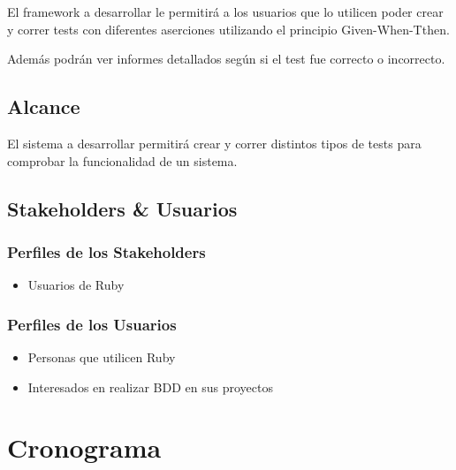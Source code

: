 \documentclass{article}
\begin{document}
El framework a desarrollar le permitirá a los usuarios que lo utilicen poder crear y correr tests con diferentes aserciones 
utilizando el principio Given-When-Tthen. \newline

Además podrán ver informes detallados según si el test fue correcto o incorrecto.

\subsection{Alcance}

El sistema a desarrollar permitirá crear y correr distintos tipos de tests para comprobar la funcionalidad de un sistema.

\subsection{Stakeholders \& Usuarios}
\subsubsection{Perfiles de los Stakeholders}
\begin{itemize}
    \item Usuarios de Ruby
\end{itemize}
\subsubsection{Perfiles de los Usuarios}
\begin{itemize}
    \item Personas que utilicen Ruby
    \item Interesados en realizar BDD en sus proyectos
\end{itemize}
\newpage

\section{Cronograma}
\end{document}
